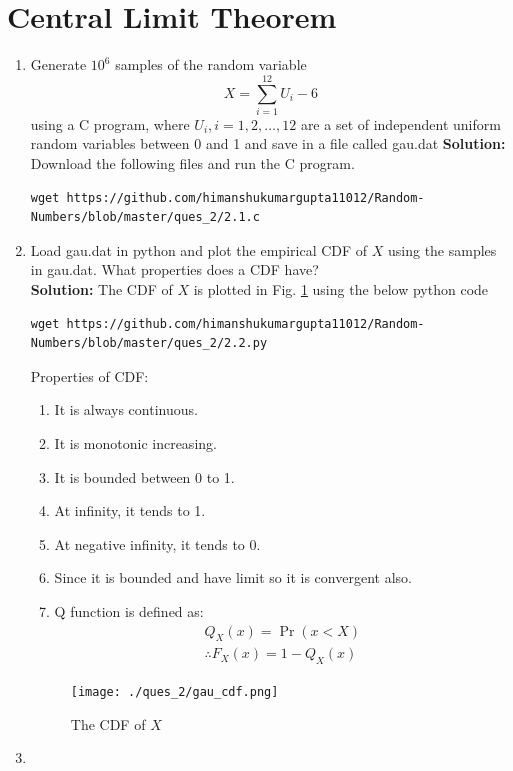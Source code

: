 \documentclass[journal,12pt,twocolumn]{IEEEtran}
\renewcommand\thesection{\arabic{section}}
\providecommand{\pr}[1]{\ensuremath{\Pr\left(#1\right)}}
\providecommand{\brak}[1]{\ensuremath{\left(#1\right)}}
\theoremstyle{remark}
\newcommand{\solution}{\noindent \textbf{Solution: }}
\numberwithin{equation}{section}
\begin{document}
\section{Central Limit Theorem}
%
\begin{enumerate}[label=\thesection.\arabic*
,ref=\thesection.\theenumi]
%
\item
Generate $10^6$ samples of the random variable
%
\begin{equation}
X = \sum_{i=1}^{12}U_i -6
\end{equation}
%
using a C program, where $U_i, i = 1,2,\dots, 12$ are  a set of independent uniform random variables between 0 and 1
and save in a file called gau.dat
%
\solution Download the following files and run the C program.
\begin{lstlisting}
wget https://github.com/himanshukumargupta11012/Random-Numbers/blob/master/ques_2/2.1.c
\end{lstlisting}
\item
Load gau.dat in python and plot the empirical CDF of $X$ using the samples in gau.dat. What properties does a CDF have?
\\
\solution The CDF of $X$ is plotted in Fig. \ref{fig:gauss_cdf}
using the below python code
\begin{lstlisting}
wget https://github.com/himanshukumargupta11012/Random-Numbers/blob/master/ques_2/2.2.py
\end{lstlisting}
Properties of CDF:
\begin{enumerate}
	\item It is always continuous.
	\item It is monotonic increasing.
	\item It is bounded between 0 to 1.
	\item At infinity, it tends to 1.
	\item At negative infinity, it tends to 0.
	\item Since it is bounded and have limit so it is convergent also.
	\item Q function is defined as:
	\begin{align}
		Q_X(x)=\pr{x<X}\\
	\therefore F_X\brak{x}=1-Q_X\brak{x}
	\end{align}
\end{enumerate}
\begin{figure}
\centering
\texttt{[image: ./ques\_2/gau\_cdf.png]}
\caption{The CDF of $X$}
\label{fig:gauss_cdf}
\end{figure}
\item

\end{enumerate}
\end{document}
